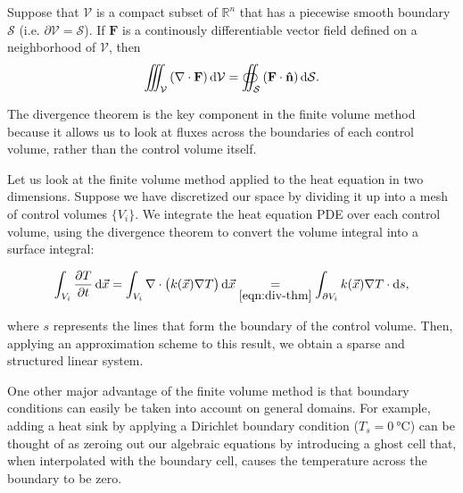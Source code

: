 \begin{thm}
	Suppose that $\mathcal{V}$ is a compact subset of $\mathbb{R}^n$ that has a piecewise smooth boundary $\mathcal{S}$ (i.e. $\partial\mathcal{V}=\mathcal{S}$). If $\mathbf{F}$ is a continously differentiable vector field defined on a neighborhood of $\mathcal{V}$, then
	\begin{equation}
		\iiint_{\mathcal{V}}\left(\nabla\cdot\mathbf{F}\right)\dif\mathcal{V}=\oiint_{\mathcal{S}}\left(\mathbf{F}\cdot\mathbf{\hat{n}}\right)\dif\mathcal{S}.\label{eqn:div-thm}
	\end{equation}
	\label{thm:div-thm}
\end{thm}

The divergence theorem is the key component in the finite volume method because it allows us to look at fluxes across the boundaries of each control volume, rather than the control volume itself.

Let us look at the finite volume method applied to the heat equation in two dimensions. Suppose we have discretized our space by dividing it up into a mesh of control volumes $\lbrace V_i\rbrace$. We integrate the heat equation PDE over each control volume, using the divergence theorem to convert the volume integral into a surface integral:

$$\int_{V_i}\frac{\partial T}{\partial t}\dif\vec{x}=\int_{V_i}\nabla\cdot \left(k(\vec{x})\nabla T\right)\dif\vec{x}\underset{\eqref{eqn:div-thm}}{=}\int_{\partial V_i}k(\vec{x})\nabla T\cdot\dif s,$$

where $s$ represents the lines that form the boundary of the control volume. Then, applying an approximation scheme to this result, we obtain a sparse and structured linear system.

One other major advantage of the finite volume method is that boundary conditions can easily be taken into account on general domains. For example, adding a heat sink by applying a Dirichlet boundary condition ($T_s=\SI{0}{\degreeCelsius}$) can be thought of as zeroing out our algebraic equations by introducing a ghost cell that, when interpolated with the boundary cell, causes the temperature across the boundary to be zero.